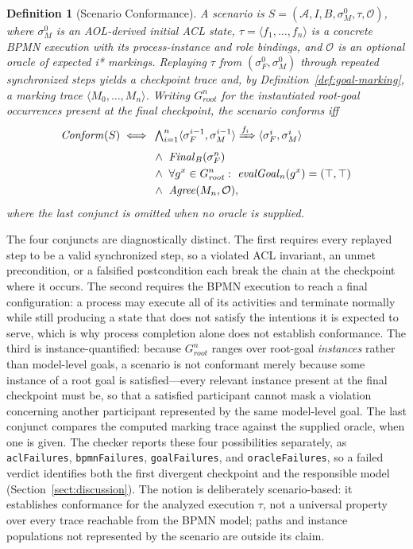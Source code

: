 \documentclass[a4paper, conference]{IEEEtran}
\newtheorem{definition}{Definition}
\begin{document}
\begin{definition}[Scenario Conformance]
\label{def:conformance}
A scenario is $S=(\mathcal A,I,B,\sigma_M^0,\tau,\mathcal O)$, where $\sigma_M^0$ is an AOL-derived initial ACL state, $\tau=\langle f_1,\ldots,f_n\rangle$ is a concrete BPMN execution with its process-instance and role bindings, and $\mathcal O$ is an optional oracle of expected i* markings. Replaying $\tau$ from $(\sigma_F^0,\sigma_M^0)$ through repeated synchronized steps yields a checkpoint trace and, by Definition~\ref{def:goal-marking}, a marking trace $\langle M_0,\ldots,M_n\rangle$. Writing $G_{\mathit{root}}^n$ for the instantiated root-goal occurrences present at the final checkpoint, the scenario conforms iff
\begin{align*}
\mathit{Conform}(S)\iff{}&
\textstyle\bigwedge_{i=1}^n\langle\sigma_F^{i-1},\sigma_M^{i-1}\rangle\xRightarrow{f_i}\langle\sigma_F^i,\sigma_M^i\rangle\\
&{}\land\ \mathit{Final}_B(\sigma_F^n)\\
&{}\land\ \forall g^x\in G_{\mathit{root}}^n:\ \mathit{evalGoal}_n(g^x)=(\top,\top)\\
&{}\land\ \mathit{Agree}(M_n,\mathcal O),
\end{align*}
where the last conjunct is omitted when no oracle is supplied.
\end{definition}

The four conjuncts are diagnostically distinct. The first requires every replayed step to be a valid synchronized step, so a violated ACL invariant, an unmet precondition, or a falsified postcondition each break the chain at the checkpoint where it occurs. The second requires the BPMN execution to reach a final configuration: a process may execute all of its activities and terminate normally while still producing a state that does not satisfy the intentions it is expected to serve, which is why process completion alone does not establish conformance. The third is instance-quantified: because $G_{\mathit{root}}^n$ ranges over root-goal \emph{instances} rather than model-level goals, a scenario is not conformant merely because some instance of a root goal is satisfied---every relevant instance present at the final checkpoint must be, so that a satisfied participant cannot mask a violation concerning another participant represented by the same model-level goal. The last conjunct compares the computed marking trace against the supplied oracle, when one is given. The checker reports these four possibilities separately, as \texttt{aclFailures}, \texttt{bpmnFailures}, \texttt{goalFailures}, and \texttt{oracleFailures}, so a failed verdict identifies both the first divergent checkpoint and the responsible model (Section~\ref{sect:discussion}). The notion is deliberately scenario-based: it establishes conformance for the analyzed execution $\tau$, not a universal property over every trace reachable from the BPMN model; paths and instance populations not represented by the scenario are outside its claim.
\end{document}
